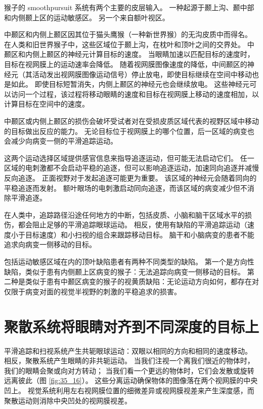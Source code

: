 猴子的 smoothpursuit 系统有两个主要的皮层输入。
一种起源于颞上沟、颞中部和内侧颞上区的运动敏感区。 另一个来自额叶视区。


中颞区和内侧上颞区因其位于猫头鹰猴（一种新世界猴）的无沟皮质中而得名。
在人类和旧世界猴子中，这些区域位于颞上沟，在枕叶和顶叶之间的交界处。
中颞区和内侧上颞区的神经元计算目标的速度。
当眼睛加速以匹配目标的速度时，目标在视网膜上的运动速率会降低。
随着视网膜图像速度的降低，中间颞区的神经元（其活动发出视网膜图像运动信号）停止放电，即使目标继续在空间中移动也是如此。
即使目标短暂消失，内侧上颞区的神经元也会继续放电。
这些神经元可以访问一个过程，该过程将移动眼睛的速度和目标在视网膜上移动的速度相加，以计算目标在空间中的速度。


中颞区或内侧上颞区的损伤会破坏受试者对在受损皮质区域代表的视野区域中移动的目标做出反应的能力。
无论目标位于视网膜上的哪个位置，后一区域的病变也会减少向病变一侧的平滑追踪运动。


这两个运动选择区域提供感官信息来指导追逐运动，但可能无法启动它们。
任一区域的电刺激都不会启动平稳的追逐，但可以影响追逐运动，加速同向追逐并减慢反向追逐。
正面视野对于发起追逐可能更为重要。
该区域的神经元会随着同向的平稳追逐而发射。
额叶眼场的电刺激启动同向追逐，而该区域的病变减少但不消除平滑追逐。


在人类中，追踪路径沿途任何地方的中断，包括皮质、小脑和脑干区域水平的损伤，都会阻止足够的平滑追踪眼球运动。
相反，使用有缺陷的平滑追踪运动（速度小于目标速度）和小扫视的组合来跟踪移动目标。 脑干和小脑病变的患者不能追求向病变一侧移动的目标。

包括运动敏感区域在内的顶叶缺陷患者有两种不同类型的缺陷。 第一个是方向性缺陷，类似于患有内侧颞上区病变的猴子：无法追踪向病变一侧移动的目标。 第二种是类似于患有中颞区病变的猴子的视黄质缺陷：无论运动方向如何，都存在对仅限于病变对面的视觉半视野的刺激的平稳追求的损害。


\section{聚散系统将眼睛对齐到不同深度的目标上}
平滑追踪和扫视系统产生共轭眼球运动：双眼以相同的方向和相同的速度移动。 相反，聚散系统产生眼睛的非共轭运动。 当我们注视一个离我们很近的物体时，我们的眼睛会聚或向对方转动； 
当我们看一个更远的物体时，它们会发散或旋转远离彼此（图 \ref{fig:35_16}）。 
这些分离运动确保物体的图像落在两个视网膜的中央凹上。 视觉系统利用左右视网膜位置的细微差异或视网膜视差来产生深度感，而聚散运动则消除中央凹处的视网膜视差。

